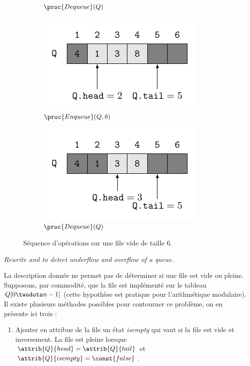 \begin{description}
\begin{ex}
\begin{figure}[H]
\begin{subfigure}[t]{.45\textwidth}
        \caption{$\proc{Dequeue}(Q)$}\label{fig:10_1-3_4}
      \end{subfigure}
      \begin{subfigure}[t]{.45\textwidth}
        \centering
        \includegraphics[scale=1]{img/10_1-3/10_1-3_5.pdf}
        \caption{$\proc{Enqueue}(Q,8)$}\label{fig:10_1-3_5}
      \end{subfigure}
      \begin{subfigure}[t]{.45\textwidth}
        \centering
        \includegraphics[scale=1]{img/10_1-3/10_1-3_6.pdf}
        \caption{$\proc{Dequeue}(Q)$}\label{fig:10_1-3_6}
      \end{subfigure}
      \caption{Séquence d'opérations sur une file vide de taille 6.} 
      \label{fig:queue-seq} 
    \end{figure}
\end{ex}
 \textit{Rewrite  and  to detect underflow and overflow of a queue.}
\begin{ex}
  La description donnée ne permet pas de déterminer si une file est vide ou pleine. Supposons, par commodité, que la file est implémenté sur le tableau $Q[0\twodots n-1]$ (cette hypothèse est pratique pour l'arithmétique modulaire). Il existe plusieurs méthodes possibles pour contourner ce problème, on en présente ici trois :
  \begin{enumerate}[label=\circled{\arabic*}]
    \item Ajouter en attribue de la file un état \textit{isempty} qui vaut  si la file est vide et  inversement. La file est pleine lorsque $\attrib{Q}{head} = \attrib{Q}{tail}$ et $\attrib{Q}{isempty} = \const{false}$.


\end{enumerate}
\end{ex}
\end{description}
